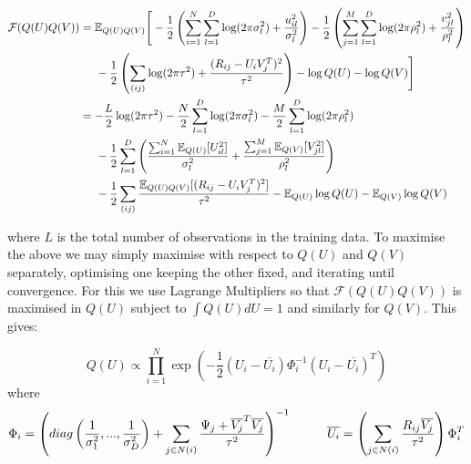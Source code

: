 \documentclass{article}
\theoremstyle{plain}
\begin{document}
\begin{minipage}{\textwidth}
\begin{equation}
\begin{split}
\mathcal{F}(Q(U)Q(V)) 
& =\mathbb{E}_{Q(U)Q(V)}\Bigg[  -\frac{1}{2}\left(\sum_{i=1}^N\sum_{l=1}^D \log (2\pi\sigma_l^2)+\frac{u_{il}^2}{\sigma_l^2}\right) -\frac{1}{2}\left(\sum_{j=1}^M\sum_{l=1}^D \log (2\pi\rho_l^2)+\frac{v_{jl}^2}{\rho_l^2}\right) \\
& \hspace{5 mm} -\frac{1}{2}\left(\sum_{(ij)} \log (2\pi\tau^2)+\frac{(R_{ij}-U_iV_j^T)^2}{\tau^2}\right)-\log Q(U) -\log Q(V) \Bigg] \\
& = -\frac{L}{2} \log (2\pi\tau^2)-\frac{N}{2}\sum_{l=1}^D \log (2\pi\sigma_l^2) - \frac{M}{2}\sum_{l=1}^D \log (2\pi\rho_l^2) \\
& \hspace{5 mm} -\frac{1}{2}\sum_{l=1}^D \left(\frac{\sum_{i=1}^N \mathbb{E}_{Q(U)}[U_{il}^2]}{\sigma_l^2} +\frac{\sum_{j=1}^M \mathbb{E}_{Q(V)}[V_{jl}^2]}{\rho_l^2}\right) \\
& \hspace{5 mm} -\frac{1}{2} \sum_{(ij)}\frac{\mathbb{E}_{Q(U)Q(V)}[(R_{ij}-U_iV_j^T)^2]}{\tau^2} -\mathbb{E}_{Q(U)} \log Q(U) - \mathbb{E}_{Q(V)} \log Q(V)
\end{split}
\end{equation}
\end{minipage}

where $L$ is the total number of observations in the training data. To maximise the above we may simply maximise with respect to $Q(U)$ and $Q(V)$ separately, optimising one keeping the other fixed, and iterating until convergence. For this we use Lagrange Multipliers so that $\mathcal{F}(Q(U)Q(V))$ is maximised in $Q(U)$ subject to $\int Q(U) dU =1$ and similarly for $Q(V)$. This gives:

\begin{minipage}{\textwidth}
\begin{equation}
Q(U) \propto \prod_{i=1}^N \exp\left(-\frac{1}{2}(U_i-\overline{U_i})\Phi_i^{-1}(U_i-\overline{U_i})^T\right)
\end{equation}
where
\begin{equation}
\Phi_i = \left(diag\left(\frac{1}{\sigma_1^2} , ... , \frac{1}{\sigma_D^2}\right)+\sum_{j \in N(i)} \frac{\Psi_j+\overline{V_j}^T\overline{V_j}}{\tau^2}\right)^{-1} \hspace{10 mm} \overline{U_i} = \left(\sum_{j\in N(i)} \frac{R_{ij}\overline{V_j}}{\tau^2} \right)\Phi_i^T 
\end{equation}
\end{minipage}
\end{document}
